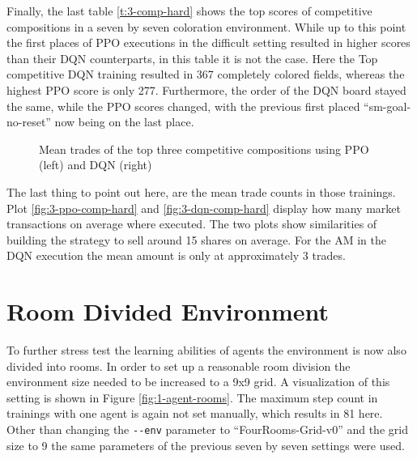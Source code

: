Finally, the last table \ref{t:3-comp-hard} shows the top scores of competitive compositions in a seven by seven coloration environment. While up to this point the first places of PPO executions in the difficult setting resulted in higher scores than their DQN counterparts, in this table it is not the case. Here the Top competitive DQN training resulted in 367 completely colored fields, whereas the highest PPO score is only 277. Furthermore, the order of the DQN board stayed the same, while the PPO scores changed, with the previous first placed ``sm-goal-no-reset'' now being on the last place. 

\begin{figure}[hpbt]
    \centering
    \hspace{0.01\textwidth}
    \caption[Mean Trades of the Top Competitive Modes in a 7x7 Environment]{Mean trades of the top three competitive compositions using PPO (left) and DQN (right)}
    \label{fig:multipic_plots_comp_hard} %
\end{figure}

The last thing to point out here, are the mean trade counts in those trainings. Plot \ref{fig:3-ppo-comp-hard} and \ref{fig:3-dqn-comp-hard} display how many market transactions on average where executed. The two plots show similarities of building the strategy to sell around 15 shares on average. For the AM in the DQN execution the mean amount is only at approximately 3 trades.

\section{Room Divided Environment}\label{room_env}
To further stress test the learning abilities of agents the environment is now also divided into rooms. In order to set up a reasonable room division the environment size needed to be increased to a 9x9 grid. A visualization of this setting is shown in Figure \ref{fig:1-agent-rooms}. The maximum step count in trainings with one agent is again not set manually, which results in 81 here. Other than changing the \verb|--env| parameter to ``FourRooms-Grid-v0'' and the grid size to 9 the same parameters of the previous seven by seven settings were used. \\

